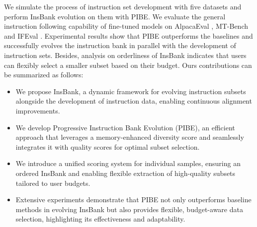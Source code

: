 We simulate the process of instruction set development with five datasets and perform InsBank evolution on them with PIBE. We evaluate the general instruction following capability of fine-tuned models on AlpacaEval \citep{benchmark-alpaca-eval}, MT-Bench \citep{benchmark-mtbench} and IFEval \citep{benchmark-ifeval}. Experimental results show that PIBE outperforms the baselines and successfully evolves the instruction bank in parallel with the development of instruction sets. Besides, analysis on orderliness of InsBank indicates that users can flexibly select a smaller subset based on their budget.
Ours contributions can be summarized as follows:
\begin{itemize}[nosep]
    \item We propose InsBank, a dynamic framework for evolving instruction subsets alongside the development of instruction data, enabling continuous alignment improvements.

    \item We develop Progressive Instruction Bank Evolution (PIBE), an efficient approach that leverages a memory-enhanced diversity score and seamlessly integrates it with quality scores for optimal subset selection.

    \item We introduce a unified scoring system for individual samples, ensuring an ordered InsBank and enabling flexible extraction of high-quality subsets tailored to user budgets.
    
    \item Extensive experiments demonstrate that PIBE not only outperforms baseline methods in evolving InsBank but also provides flexible, budget-aware data selection, highlighting its effectiveness and adaptability.

\end{itemize}
